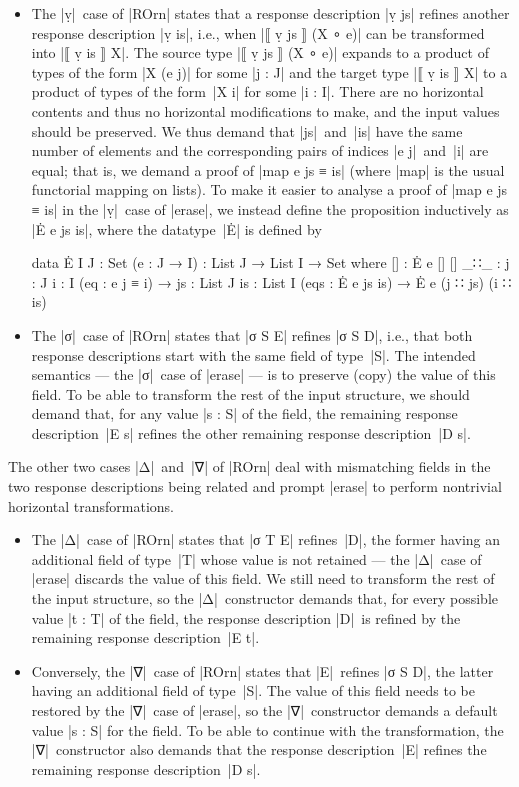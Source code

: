 \begin{itemize}
\item The |ṿ|~case of |ROrn| states that a response description |ṿ js| refines another response description |ṿ is|, i.e., when |⟦ ṿ js ⟧ (X ∘ e)| can be transformed into |⟦ ṿ is ⟧ X|.
The source type |⟦ ṿ js ⟧ (X ∘ e)| expands to a product of types of the form |X (e j)| for some |j : J| and the target type |⟦ ṿ is ⟧ X| to a product of types of the form~|X i| for some |i : I|.
There are no horizontal contents and thus no horizontal modifications to make, and the input values should be preserved.
We thus demand that |js|~and~|is| have the same number of elements and the corresponding pairs of indices |e j|~and~|i| are equal; that is, we demand a proof of |map e js ≡ is| (where |map| is the usual functorial mapping on lists).
To make it easier to analyse a proof of |map e js ≡ is| in the |ṿ|~case of |erase|, we instead define the proposition inductively as |Ė e js is|, where the datatype~|Ė| is defined by
\begin{code}
data Ė {I J : Set} (e : J → I) : List J → List I → Set where
  []   :  Ė e [] []
  _∷_  :  {j : J} {i : I} (eq : e j ≡ i) →
          {js : List J} {is : List I} (eqs : Ė e js is) → Ė e (j ∷ js) (i ∷ is)
\end{code}
\item The |σ|~case of |ROrn| states that |σ S E| refines |σ S D|, i.e., that both response descriptions start with the same field of type~|S|.
The intended semantics --- the |σ|~case of |erase| --- is to preserve (copy) the value of this field.
To be able to transform the rest of the input structure, we should demand that, for any value |s : S| of the field, the remaining response description~|E s| refines the other remaining response description~|D s|.
\end{itemize}
The other two cases |Δ|~and~|∇| of |ROrn| deal with mismatching fields in the two response descriptions being related and prompt |erase| to perform nontrivial horizontal transformations.
\begin{itemize}
\item The |Δ|~case of |ROrn| states that |σ T E| refines~|D|, the former having an additional field of type~|T| whose value is not retained --- the |Δ|~case of |erase| discards the value of this field.
We still need to transform the rest of the input structure, so the |Δ|~constructor demands that, for every possible value |t : T| of the field, the response description |D|~is refined by the remaining response description~|E t|.
\item Conversely, the |∇|~case of |ROrn| states that |E|~refines |σ S D|, the latter having an additional field of type~|S|.
The value of this field needs to be restored by the |∇|~case of |erase|, so the |∇|~constructor demands a default value |s : S| for the field.
To be able to continue with the transformation, the |∇|~constructor also demands that the response description~|E| refines the remaining response description~|D s|.
\end{itemize}

